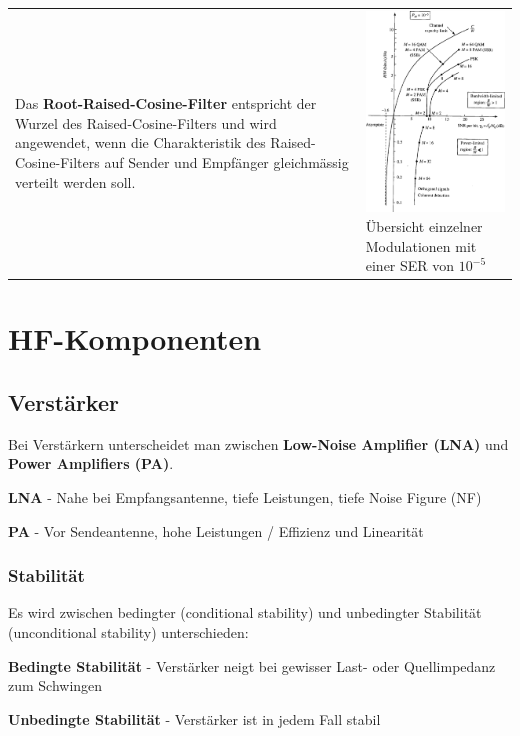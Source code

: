 \begin{tabular}{ll}
{    Das \textbf{Root-Raised-Cosine-Filter} entspricht der Wurzel des
    Raised-Cosine-Filters und wird angewendet, wenn die Charakteristik 
    des Raised-Cosine-Filters auf Sender und Empfänger
    gleichmässig verteilt werden soll.
    } &\parbox{7cm}{
	\includegraphics[width=7cm]{./bilder/modulation_SER.png}\\
	Übersicht einzelner Modulationen mit einer SER von $10^{-5}$
	}
\end{tabular}

\newpage



\section{HF-Komponenten }
\subsection{Verstärker }
Bei Verstärkern unterscheidet man zwischen \textbf{Low-Noise Amplifier (LNA)} und \textbf{Power
Amplifiers (PA)}. \\
\begin{liste}
\item \textbf{LNA} - Nahe bei Empfangsantenne, tiefe Leistungen, tiefe Noise Figure (NF)
\item \textbf{PA} - Vor Sendeantenne, hohe Leistungen / Effizienz und Linearität
\end{liste}

\subsubsection{Stabilität }
Es wird zwischen bedingter (conditional stability) und unbedingter Stabilität (unconditional
stability) unterschieden:
\begin{liste}
\item \textbf{Bedingte Stabilität} - Verstärker neigt bei gewisser Last- oder Quellimpedanz zum
Schwingen
\item \textbf{Unbedingte Stabilität} - Verstärker ist in jedem Fall stabil
\end{liste}
\vspace{.2cm}

